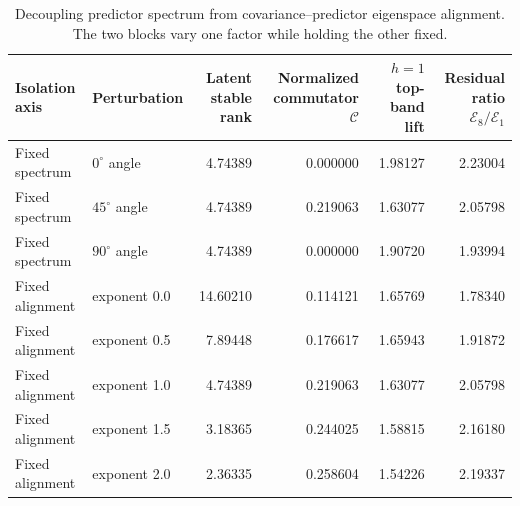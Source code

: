 \documentclass{article}
\begin{document}
\begin{table}[H]
\centering
\caption{Decoupling predictor spectrum from covariance--predictor eigenspace alignment. The two blocks vary one factor while holding the other fixed.}
\label{tab:supp-decoupling}
\setlength{\tabcolsep}{3pt}
\begin{tabular*}{\linewidth}{@{\extracolsep{\fill}}llrrrr@{}}
\toprule
Isolation axis & Perturbation & \shortstack{Latent\\stable rank} & \shortstack{Normalized\\commutator $\mathcal C$} & \shortstack{$h=1$\\top-band lift} & \shortstack{Residual ratio\\$\mathcal E_8/\mathcal E_1$} \\
\midrule
Fixed spectrum & $0^\circ$ angle & 4.74389 & 0.000000 & 1.98127 & 2.23004 \\
Fixed spectrum & $45^\circ$ angle & 4.74389 & 0.219063 & 1.63077 & 2.05798 \\
Fixed spectrum & $90^\circ$ angle & 4.74389 & 0.000000 & 1.90720 & 1.93994 \\
\midrule
Fixed alignment & exponent 0.0 & 14.60210 & 0.114121 & 1.65769 & 1.78340 \\
Fixed alignment & exponent 0.5 & 7.89448 & 0.176617 & 1.65943 & 1.91872 \\
Fixed alignment & exponent 1.0 & 4.74389 & 0.219063 & 1.63077 & 2.05798 \\
Fixed alignment & exponent 1.5 & 3.18365 & 0.244025 & 1.58815 & 2.16180 \\
Fixed alignment & exponent 2.0 & 2.36335 & 0.258604 & 1.54226 & 2.19337 \\
\bottomrule
\end{tabular*}
\end{table}
\end{document}
